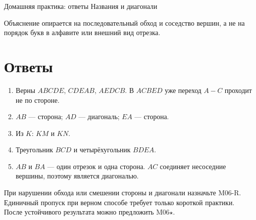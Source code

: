 \worksheettitle
  {Домашняя практика: ответы}
  { Названия и диагонали}

\begin{teacherbox}[Критерии]
  Объяснение опирается на последовательный обход и соседство вершин, а не
  на порядок букв в алфавите или внешний вид отрезка.
\end{teacherbox}

\section{Ответы}

\begin{enumerate}
  \item Верны $ABCDE$, $CDEAB$, $AEDCB$. В $ACBED$ уже переход $A-C$
    проходит не по стороне.
  \item $AB$ --- сторона; $AD$ --- диагональ; $EA$ --- сторона.
  \item Из $K$: $KM$ и $KN$.
  \item Треугольник $BCD$ и четырёхугольник $BDEA$.
  \item $AB$ и $BA$ --- один отрезок и одна сторона. $AC$ соединяет
    несоседние вершины, поэтому является диагональю.
\end{enumerate}

\begin{resultbox}[Маршрут]
  При нарушении обхода или смешении стороны и диагонали назначьте M06-R.
  Единичный пропуск при верном способе требует только короткой практики.
  После устойчивого результата можно предложить M06\(\star\).
\end{resultbox}
